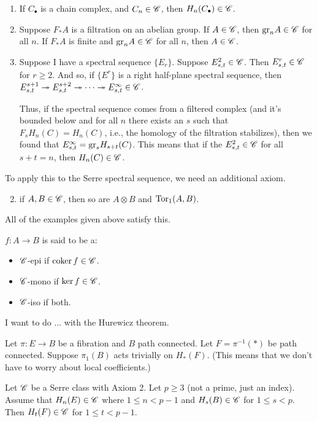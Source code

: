 \begin{remark}
    \begin{enumerate}
	\item If $C_\bullet$ is a chain complex, and $C_n\in \mathscr C$, then $H_n(C_\bullet)\in\mathscr C$.
	\item Suppose $F_\ast A$ is a filtration on an abelian group.
	    If $A\in\mathscr C$, then $\mathrm{gr}_nA\in\mathscr C$ for all $n$.
	    If $F_\ast A$ is finite and $\mathrm{gr}_n A\in\mathscr C$ for all $n$, then $A\in\mathscr C$.
	\item Suppose I have a spectral sequence $\{E_r\}$.
	    Suppose $E^2_{s,t}\in \mathscr C$.
	    Then $E^r_{s,t}\in \mathscr C$ for $r\geq 2$.
	    And so, if $\{E^r\}$ is a right half-plane spectral sequence, then $E^{s+1}_{s,t}\twoheadrightarrow E^{s+2}_{s,t}\twoheadrightarrow\cdots\twoheadrightarrow E^\infty_{s,t}\in\mathscr C$.

	    Thus, if the spectral sequence comes from a filtered complex (and it's bounded below and for all $n$ there exists an $s$ such that $F_s H_n(C) = H_n(C)$, i.e., the homology of the filtration stabilizes), then
	    we found that $E^\infty_{s,t} = \mathrm{gr}_s H_{s+t}(C)$.
	    This means that if the $E^2_{s,t}\in\mathscr C$ for all $s+t = n$, then $H_n(C)\in\mathscr C$. 
    \end{enumerate}
\end{remark}
To apply this to the Serre spectral sequence, we need an additional axiom.
\begin{enumerate}
	\setcounter{enumi}{1}
    \item if $A,B\in\mathscr C$, then so are $A\otimes B$ and $\operatorname{Tor}_1(A,B)$.
\end{enumerate}
All of the examples given above satisfy this.
\begin{notation}
    $f:A\to B$ is said to be a:
    \begin{itemize}
	\item $\mathscr C$-epi if $\operatorname{coker} f\in \mathscr C$.
	\item $\mathscr C$-mono if $\ker f\in\mathscr C$.
	\item $\mathscr C$-iso if both.
    \end{itemize}
\end{notation}
I want to do ... with the Hurewicz theorem.
\begin{prop}
    Let $\pi:E\to B$ be a fibration and $B$ path connected.
    Let $F = \pi^{-1}(\ast)$ be path connected.
    Suppose $\pi_1(B)$ acts trivially on $H_\ast(F)$.
    (This means that we don't have to worry about local coefficients.)

    Let $\mathscr C$ be a Serre class with Axiom 2.
    Let $p\geq 3$ (not a prime, just an index).
    Assume that $H_n(E)\in\mathscr C$ where $1\leq n<p-1$ and
    $H_s(B)\in \mathscr C$ for $1\leq s<p$.
    Then $H_t(F)\in\mathscr C$ for $1\leq t<p-1$.
\end{prop}
